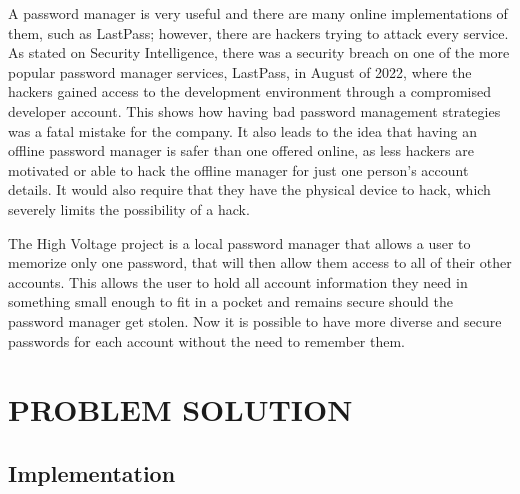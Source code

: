 \documentclass[12pt]{article}
\begin{document}
\hspace{1cm}A password manager is very useful and there are many online implementations of them, such as LastPass; however, there are hackers trying to attack every service. As stated on Security Intelligence, there was a security breach on one of the more popular password manager services, LastPass, in August of 2022, where the hackers gained access to the development environment through a compromised developer account\cite{securityintel}. This shows how having bad password management strategies was a fatal mistake for the company. It also leads to the idea that having an offline password manager is safer than one offered online, as less hackers are motivated or able to hack the offline manager for just one person's account details. It would also require that they have the physical device to hack, which severely limits the possibility of a hack. 

\hspace{1cm}The High Voltage project is a local password manager that allows a user to memorize only one password, that will then allow them access to all of their other accounts. This allows the user to hold all account information they need in something small enough to fit in a pocket and remains secure should the password manager get stolen. Now it is possible to have more diverse and secure passwords for each account without the need to remember them.


\section{PROBLEM SOLUTION}

\subsection{Implementation}
\end{document}
